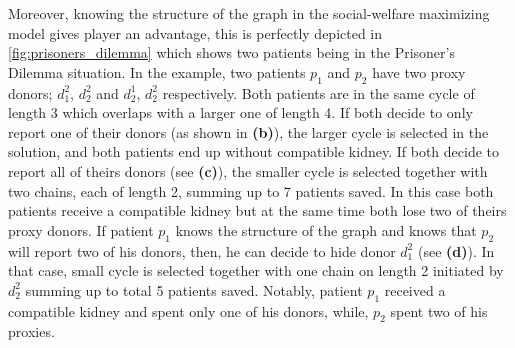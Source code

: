 Moreover, knowing the structure of the graph in the social-welfare maximizing model gives player an advantage, this is perfectly depicted in \autoref{fig:prisoners_dilemma} which shows two patients being in the Prisoner's Dilemma situation. In the example, two patients $p_1$ and $p_2$ have two proxy donors; $d_1^2$, $d_2^2$ and $d_2^1$, $d_2^2$ respectively. Both patients are in the same cycle of length 3 which overlaps with a larger one of length 4. If both decide to only report one of their donors (as shown in \textbf{(b)}), the larger cycle is selected in the solution, and both patients end up without compatible kidney. If both decide to report all of theirs donors (see \textbf{(c)}), the smaller cycle is selected together with two chains, each of length 2, summing up to 7 patients saved. In this case both patients receive a compatible kidney but at the same time both lose two of theirs proxy donors. If patient $p_1$ knows the structure of the graph and knows that $p_2$ will report two of his donors, then, he can decide to hide donor $d_1^2$ (see \textbf{(d)}). In that case, small cycle is selected together with one chain on length 2 initiated by $d_2^2$ summing up to total 5 patients saved. Notably, patient $p_1$ received a compatible kidney and spent only one of his donors, while, $p_2$ spent two of his proxies.


